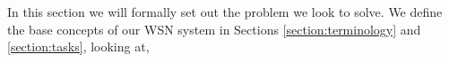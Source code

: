 
In this section we will formally set out the problem we look to solve. We define the base concepts of our WSN system in Sections \ref{section:terminology} and \ref{section:tasks}, looking at,

